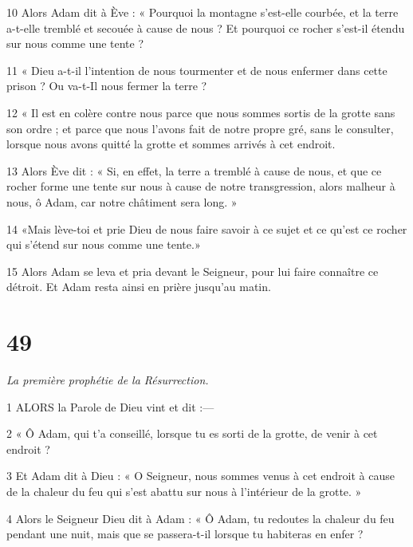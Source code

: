 \par 10 Alors Adam dit à Ève : « Pourquoi la montagne s'est-elle courbée, et la terre a-t-elle tremblé et secouée à cause de nous ? Et pourquoi ce rocher s’est-il étendu sur nous comme une tente ?

\par 11 « Dieu a-t-il l'intention de nous tourmenter et de nous enfermer dans cette prison ? Ou va-t-Il nous fermer la terre ?

\par 12 « Il est en colère contre nous parce que nous sommes sortis de la grotte sans son ordre ; et parce que nous l'avons fait de notre propre gré, sans le consulter, lorsque nous avons quitté la grotte et sommes arrivés à cet endroit.

\par 13 Alors Ève dit : « Si, en effet, la terre a tremblé à cause de nous, et que ce rocher forme une tente sur nous à cause de notre transgression, alors malheur à nous, ô Adam, car notre châtiment sera long. »

\par 14 «Mais lève-toi et prie Dieu de nous faire savoir à ce sujet et ce qu'est ce rocher qui s'étend sur nous comme une tente.»

\par 15 Alors Adam se leva et pria devant le Seigneur, pour lui faire connaître ce détroit. Et Adam resta ainsi en prière jusqu'au matin.

\chapter{49}

\par \textit{La première prophétie de la Résurrection.}

\par 1 ALORS la Parole de Dieu vint et dit :—

\par 2 « Ô Adam, qui t'a conseillé, lorsque tu es sorti de la grotte, de venir à cet endroit ?

\par 3 Et Adam dit à Dieu : « O Seigneur, nous sommes venus à cet endroit à cause de la chaleur du feu qui s'est abattu sur nous à l'intérieur de la grotte. »

\par 4 Alors le Seigneur Dieu dit à Adam : « Ô Adam, tu redoutes la chaleur du feu pendant une nuit, mais que se passera-t-il lorsque tu habiteras en enfer ?

